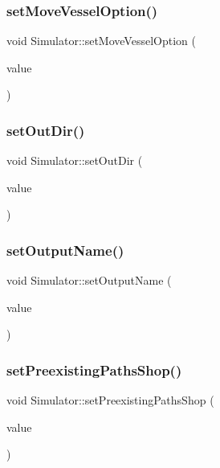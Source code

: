 \subsubsection{\texorpdfstring{setMoveVesselOption()}{setMoveVesselOption()}}
{\footnotesize\ttfamily void Simulator\+::set\+Move\+Vessel\+Option (\begin{DoxyParamCaption}\item[{bool}]{value }\end{DoxyParamCaption})}

\mbox{\label{class_simulator_a7abdeb99b1bd7d5784e09f68e5e7912a}} 
\subsubsection{\texorpdfstring{setOutDir()}{setOutDir()}}
{\footnotesize\ttfamily void Simulator\+::set\+Out\+Dir (\begin{DoxyParamCaption}\item[{const Q\+String \&}]{value }\end{DoxyParamCaption})}

\mbox{\label{class_simulator_a6e06309fae0c2341a81173eb084cf9c8}} 
\subsubsection{\texorpdfstring{setOutputName()}{setOutputName()}}
{\footnotesize\ttfamily void Simulator\+::set\+Output\+Name (\begin{DoxyParamCaption}\item[{const Q\+String \&}]{value }\end{DoxyParamCaption})}

\mbox{\label{class_simulator_a03e352c3e0da46be50981e32974ec948}} 
\subsubsection{\texorpdfstring{setPreexistingPathsShop()}{setPreexistingPathsShop()}}
{\footnotesize\ttfamily void Simulator\+::set\+Preexisting\+Paths\+Shop (\begin{DoxyParamCaption}\item[{int}]{value }\end{DoxyParamCaption})}


